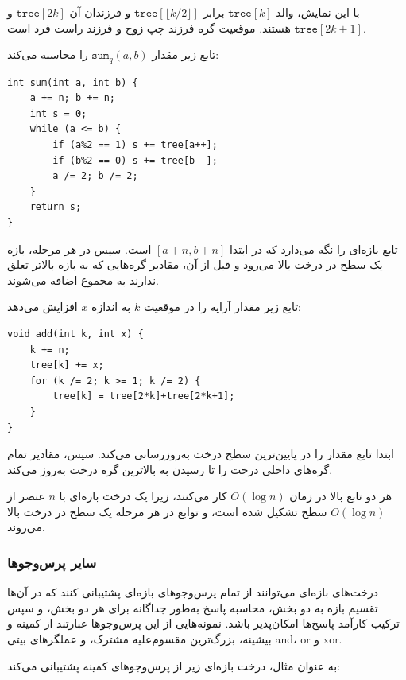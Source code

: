 با این نمایش،
والد $\texttt{tree}[k]$
برابر $\texttt{tree}[\lfloor k/2 \rfloor]$
و فرزندان آن $\texttt{tree}[2k]$
و $\texttt{tree}[2k+1]$ هستند.
موقعیت گره فرزند چپ زوج و فرزند راست فرد است.

تابع زیر
مقدار $\texttt{sum}_q(a,b)$ را محاسبه می‌کند:
\begin{lstlisting}
int sum(int a, int b) {
    a += n; b += n;
    int s = 0;
    while (a <= b) {
        if (a%2 == 1) s += tree[a++];
        if (b%2 == 0) s += tree[b--];
        a /= 2; b /= 2;
    }
    return s;
}
\end{lstlisting}
تابع بازه‌ای را نگه می‌دارد
که در ابتدا $[a+n,b+n]$ است.
سپس در هر مرحله، بازه یک سطح در درخت بالا می‌رود
و قبل از آن، مقادیر گره‌هایی که به بازه بالاتر
تعلق ندارند به مجموع اضافه می‌شوند.

تابع زیر مقدار آرایه را در موقعیت $k$ به اندازه $x$ افزایش می‌دهد:
\begin{lstlisting}
void add(int k, int x) {
    k += n;
    tree[k] += x;
    for (k /= 2; k >= 1; k /= 2) {
        tree[k] = tree[2*k]+tree[2*k+1];
    }
}
\end{lstlisting}
ابتدا تابع مقدار را در پایین‌ترین سطح درخت به‌روزرسانی می‌کند.
سپس، مقادیر تمام گره‌های داخلی درخت را تا رسیدن به بالاترین گره درخت به‌روز می‌کند.

هر دو تابع بالا در زمان $O(\log n)$ کار می‌کنند، زیرا یک درخت بازه‌ای با $n$ عنصر از $O(\log n)$ سطح تشکیل شده است، و توابع در هر مرحله یک سطح در درخت بالا می‌روند.

\subsubsection{سایر پرس‌وجوها}

درخت‌های بازه‌ای می‌توانند از تمام پرس‌وجوهای بازه‌ای پشتیبانی کنند که در آن‌ها تقسیم بازه به دو بخش، محاسبه پاسخ به‌طور جداگانه برای هر دو بخش، و سپس ترکیب کارآمد پاسخ‌ها امکان‌پذیر باشد.
نمونه‌هایی از این پرس‌وجوها عبارتند از کمینه و بیشینه، بزرگ‌ترین مقسوم‌علیه مشترک، و عملگرهای بیتی and، or و xor.

به عنوان مثال، درخت بازه‌ای زیر از پرس‌وجوهای کمینه پشتیبانی می‌کند:


